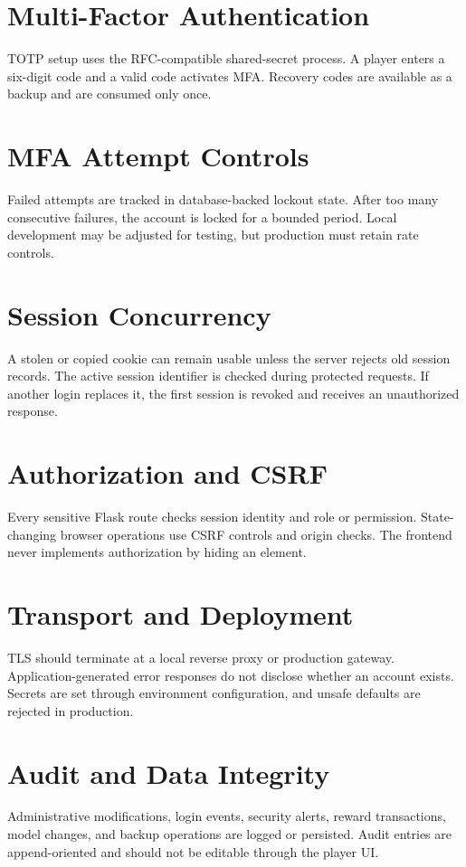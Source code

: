 \documentclass[12pt,a4paper,oneside]{report}
\begin{document}
\section{Multi-Factor Authentication}
TOTP setup uses the RFC-compatible shared-secret process. A player enters a six-digit code and a valid code activates MFA. Recovery codes are available as a backup and are consumed only once.

\section{MFA Attempt Controls}
Failed attempts are tracked in database-backed lockout state. After too many consecutive failures, the account is locked for a bounded period. Local development may be adjusted for testing, but production must retain rate controls.

\section{Session Concurrency}
A stolen or copied cookie can remain usable unless the server rejects old session records. The active session identifier is checked during protected requests. If another login replaces it, the first session is revoked and receives an unauthorized response.

\section{Authorization and CSRF}
Every sensitive Flask route checks session identity and role or permission. State-changing browser operations use CSRF controls and origin checks. The frontend never implements authorization by hiding an element.

\section{Transport and Deployment}
TLS should terminate at a local reverse proxy or production gateway. Application-generated error responses do not disclose whether an account exists. Secrets are set through environment configuration, and unsafe defaults are rejected in production.

\section{Audit and Data Integrity}
Administrative modifications, login events, security alerts, reward transactions, model changes, and backup operations are logged or persisted. Audit entries are append-oriented and should not be editable through the player UI.
\end{document}
